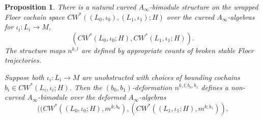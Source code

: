 \documentclass{amsart}
\newtheorem{proposition}[theorem]{Proposition}
\numberwithin{equation}{section}
\numberwithin{figure}{section}
\begin{document}
\begin{proposition}\label{prop: the curved A-infinity bimodule for a pair}
	There is a natural curved $A_{\infty}$-bimodule structure on the wrapped Floer cochain space $CW^{*}((L_{0}, \iota_{0}), (L_{1}, \iota_{1}); H)$ over the curved $A_{\infty}$-algebras for $\iota_{i}: L_{i} \to M$, 
\begin{equation*}
(CW^{*}(L_{0}, \iota_{0}; H), CW^{*}(L_{1}, \iota_{1}; H)).
\end{equation*}
The structure maps $n^{k, l}$ are defined by appropriate counts of broken stable Floer trajectories. \par
	Suppose both $\iota_{i}: L_{i} \to M$ are unobstructed with choices of bounding cochains $b_{i} \in CW^{*}(L_{i}, \iota_{i}; H)$. Then the $(b_{0}, b_{1})$-deformation $n^{k, l; b_{0}, b_{1}}$ defines a non-curved $A_{\infty}$-bimodule over the deformed $A_{\infty}$-algebras
\begin{equation*}
((CW^{*}((L_{0}, \iota_{0}; H), m^{k; b_{0}}), (CW^{*}((L_{1}, \iota_{1}; H), m^{k; b_{1}})).
\end{equation*}
\end{proposition}
\end{document}
